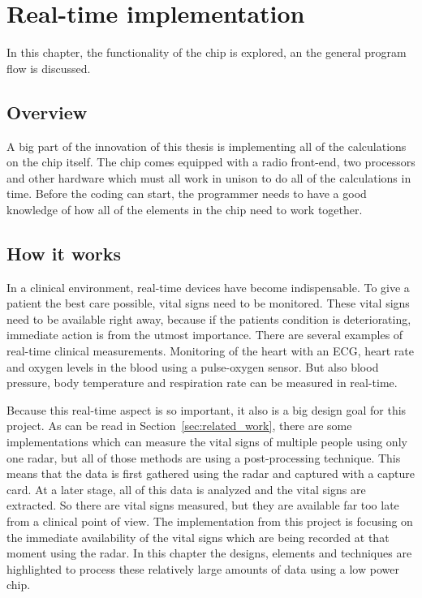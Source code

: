 \chapter{Real-time implementation}
\label{chp:realtime_implementation}

In this chapter, the functionality of the chip is explored, an the general program flow is discussed.

\section{Overview}
A big part of the innovation of this thesis is implementing all of the calculations on the chip itself. The chip comes equipped with a radio front-end, two processors and other hardware which must all work in unison to do all of the calculations in time. Before the coding can start, the programmer needs to have a good knowledge of how all of the elements in the chip need to work together.

\section{How it works}
In a clinical environment, real-time devices have become indispensable. To give a patient the best care possible, vital signs need to be monitored. These vital signs need to be available right away, because if the patients condition is deteriorating, immediate action is from the utmost importance. There are several examples of real-time clinical measurements. Monitoring of the heart with an ECG, heart rate and oxygen levels in the blood using a pulse-oxygen sensor. But also blood pressure, body temperature and respiration rate can be measured in real-time.

Because this real-time aspect is so important, it also is a big design goal for this project. As can be read in Section~\ref{sec:related_work}, there are some implementations which can measure the vital signs of multiple people using only one radar, but all of those methods are using a post-processing technique. This means that the data is first gathered using the radar and captured with a capture card. At a later stage, all of this data is analyzed and the vital signs are extracted. So there are vital signs measured, but they are available far too late from a clinical point of view. The implementation from this project is focusing on the immediate availability of the vital signs which are being recorded at that moment using the radar. In this chapter the designs, elements and techniques are highlighted to process these relatively large amounts of data using a low power chip.

